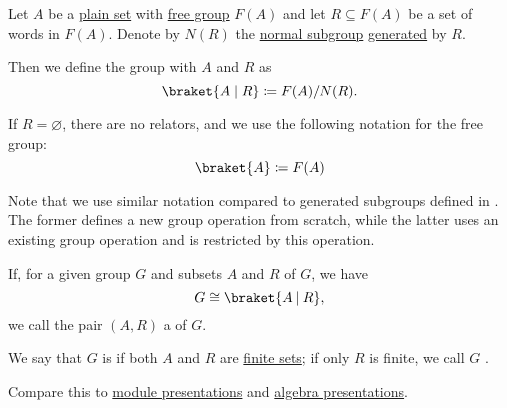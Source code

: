 \begin{definition}\label{def:group_presentation}
  Let \( A \) be a \hyperref[def:set]{plain set} with \hyperref[def:free_group]{free group} \( F(A) \) and let \( R \subseteq F(A) \) be a set of words in \( F(A) \). Denote by \( N(R) \) the \hyperref[def:normal_subgroup]{normal subgroup} \hyperref[def:first_order_generated_substructure]{generated} by \( R \).

  Then we define the group with  \( A \) and  \( R \) as
  \begin{equation}\label{eq:def:group_presentation/presentation}
    \braket{ A \mid R } \coloneqq F(A) / N(R).
  \end{equation}

  If \( R = \varnothing \), there are no relators, and we use the following notation for the free group:
  \begin{equation}\label{eq:def:group_presentation/free}
    \braket{ A } \coloneqq F(A)
  \end{equation}

  Note that we use similar notation compared to generated subgroups defined in . The former defines a new group operation from scratch, while the latter uses an existing group operation and is restricted by this operation.

  If, for a given group \( G \) and subsets \( A \) and \( R \) of \( G \), we have
  \begin{equation*}
    G \cong \braket{ A \given R },
  \end{equation*}
  we call the pair \( (A, R) \) a  of \( G \).

  We say that \( G \) is  if both \( A \) and \( R \) are \hyperref[def:set_finiteness]{finite sets}; if only \( R \) is finite, we call \( G \) .
\end{definition}
\begin{comments}
  \item Compare this to \hyperref[def:module_presentation]{module presentations} and \hyperref[def:algebra_presentation]{algebra presentations}.
\end{comments}


